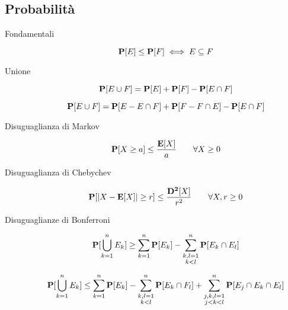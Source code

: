 \subsection{Probabilità}
\begin{description}
	
	\item[Fondamentali]
		\begin{equation}
		\mathbf{P}[E]\leq\mathbf{P}[F]\iff E\subseteq F
		\end{equation}
	
	\item[Unione]
		\begin{equation}
		\mathbf{P}[E \cup F] = \mathbf{P}[E]+\mathbf{P}[F]-\mathbf{P}[E \cap F]
		\end{equation}
		
		\begin{equation}
		\mathbf{P}[E \cup F] = \mathbf{P}[E-E\cap F]+\mathbf{P}[F-F\cap E]-\mathbf{P}[E \cap F]
		\end{equation}
	
	\item [Disuguaglianza di Markov]
		\begin{equation}
		\mathbf{P}[X \geq a] \leq \frac{\mathbf{E}[X]}{a}
		\qquad
		\forall X \geq 0
		\end{equation}
	
	\item [Disuguaglianza di Chebychev]
		\begin{equation}
		\mathbf{P}[|X-\mathbf{E}[X]| \geq r] \leq \frac{\mathbf{D^{2}}[X]}{r^{2}}
		\qquad
		\forall X, r \geq 0
		\end{equation}
	
	\item [Disuguaglianze di Bonferroni]
		\begin{equation}
		\mathbf{P}[\bigcup_{k=1}^{n}E_{k}] \geq \sum_{k=1}^{n}\mathbf{P}[E_{k}]-\sum_{\substack{k,l=1\\k<l}}^{n}\mathbf{P}[E_{k}\cap E_{l}]
		\end{equation}
		
		\begin{equation}
		\mathbf{P}[\bigcup_{k=1}^{n}E_{k}] \leq \sum_{k=1}^{n}\mathbf{P}[E_{k}]
		-\sum_{\substack{k,l=1\\k<l}}^{n}\mathbf{P}[E_{k}\cap F_{l}]
		+\sum_{\substack{j,k,l=1\\j<k<l}}^{n}\mathbf{P}[E_{j}\cap E_{k}\cap E_{l}]
		\end{equation}
	

\end{description}

